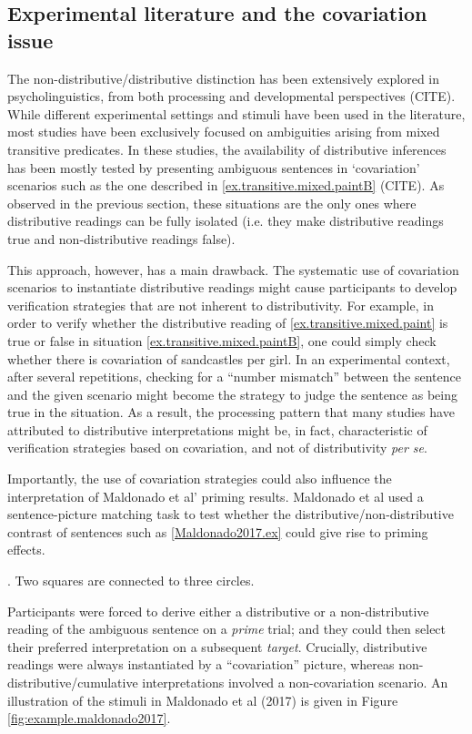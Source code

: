\documentclass[a4paper, 11pt]{article}
\newcommand{\addMM}[1]{{\leavevmode\color{red}#1}}
\begin{document}
\subsection{Experimental literature and the covariation issue}
The non-distributive/distributive distinction has been extensively explored in psycholinguistics, from both processing and developmental perspectives (CITE). 
While different experimental settings and stimuli have been used in the literature, most studies have been exclusively focused on ambiguities arising from mixed transitive predicates. 
In these studies, the availability of distributive inferences has been mostly tested by presenting ambiguous sentences in `covariation' scenarios such as the one described in \ref{ex.transitive.mixed.paintB} (CITE). 
\addMM{As observed in the previous section, these situations are the only ones where distributive readings can be fully isolated (i.e. they make distributive readings true and non-distributive readings false).}

This approach, however, has a main drawback. The systematic use of covariation scenarios to instantiate distributive readings might cause participants to develop verification strategies that are not inherent to distributivity. 
For example, in order to verify whether the distributive reading of \ref{ex.transitive.mixed.paint} is true or false in situation \ref{ex.transitive.mixed.paintB}, one could simply check whether there is covariation of sandcastles per girl. 
In an experimental context, after several repetitions, checking for a ``number mismatch'' between the sentence and the given scenario might become the strategy to judge the sentence as being true in the situation. 
As a result, the processing pattern that many studies have attributed to distributive interpretations might be, in fact, characteristic of verification strategies based on covariation, and not of distributivity \textit{per se}. 

Importantly, the use of covariation strategies could also influence the interpretation of Maldonado et al' priming results. 
Maldonado et al used a sentence-picture matching task to test whether the distributive/non-distributive contrast of sentences such as \ref{Maldonado2017.ex} could give rise to priming effects. 

\ex. Two squares are connected to three circles. \label{Maldonado2017.ex}

%
Participants were forced to derive either a distributive or a non-distributive reading of the ambiguous sentence on a \emph{prime} trial; and they could then select their preferred interpretation on a subsequent \emph{target}. 
%
Crucially, distributive readings were always instantiated by a ``covariation'' picture, whereas non-distributive/cumulative interpretations involved a non-covariation scenario.  An illustration of the stimuli in Maldonado et al (2017) is given in Figure \ref{fig:example.maldonado2017}. 
\end{document}
